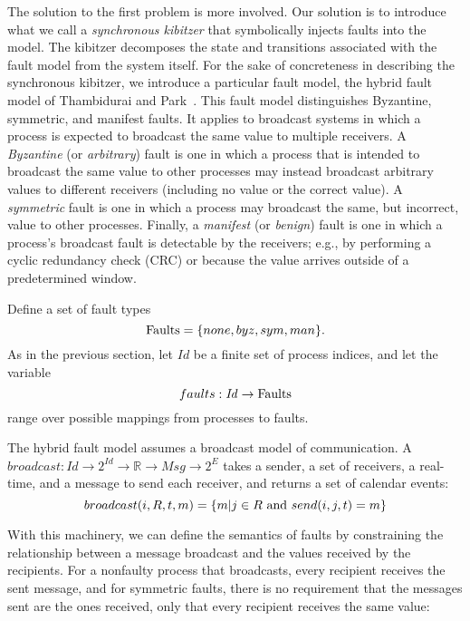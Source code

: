 \documentclass{llncs/llncs}
\newcommand{\Id}{\ensuremath{\mathit{Id}}\xspace}
\newcommand{\Msg}{\ensuremath{\mathit{Msg}}\xspace}
\begin{document}
The solution to the first problem is more involved. Our solution is to introduce what we call a \emph{synchronous kibitzer} that symbolically injects faults into the model. The kibitzer decomposes the state and transitions associated with the fault model from the system itself. For the sake of concreteness in describing the synchronous kibitzer, we introduce a particular fault model, the hybrid fault model of Thambidurai and Park~\cite{hybrid}. This fault model distinguishes Byzantine, symmetric, and manifest faults. It  applies to broadcast systems in which a process is expected to broadcast the same value to multiple receivers. A \emph{Byzantine} (or \emph{arbitrary}) fault is one in which a process that is intended to broadcast the same value to other processes may instead broadcast arbitrary values to different receivers (including no value or the correct value). A \emph{symmetric} fault is one in which a process may broadcast the same, but incorrect, value to other processes. Finally, a \emph{manifest} (or \emph{benign}) fault is one in which a process's broadcast fault is detectable by the receivers; e.g., by performing a cyclic redundancy check (CRC) or because the value arrives outside of a predetermined window.


Define a set of fault types $$\textnormal{Faults} = \{none, byz, sym, man\}.$$ As in the previous section, let $\Id$ be a finite set of process indices, and let the variable $$faults: \Id \rightarrow \textnormal{Faults}$$ range over possible mappings from processes to faults.

The hybrid fault model assumes a broadcast model of communication.
A $broadcast: \Id \rightarrow 2^{\Id} \rightarrow \mathbb{R} \rightarrow \Msg \rightarrow 2^{E}$ takes a sender, a set of receivers, a real-time, and a message to send each receiver, and returns a set of calendar events:
$$broadcast(i, R, t, m) = \{m | j \in R \textnormal{ and } send(i, j, t) = m\}$$

With this machinery, we can define the semantics of faults by constraining the relationship between a message broadcast and the values received by the recipients. For a nonfaulty process that broadcasts, every recipient receives the sent message, and for symmetric faults, there is no requirement that the messages sent are the ones received, only that every recipient receives the same value:
\noindent
\end{document}
